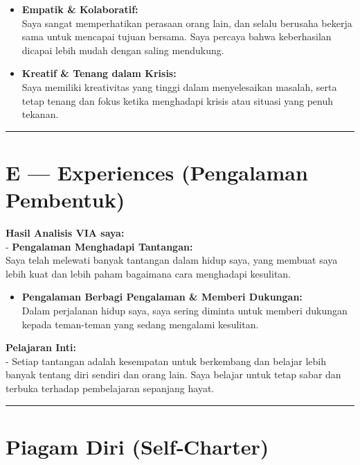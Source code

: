 \documentclass[
  letterpaper,
  DIV=11,
  numbers=noendperiod]{scrreprt}
\providecommand{\tightlist}{%
  \setlength{\itemsep}{0pt}\setlength{\parskip}{0pt}}
\begin{document}
\begin{itemize}
\item
  \textbf{Empatik \& Kolaboratif:}\\
  Saya sangat memperhatikan perasaan orang lain, dan selalu berusaha
  bekerja sama untuk mencapai tujuan bersama. Saya percaya bahwa
  keberhasilan dicapai lebih mudah dengan saling mendukung.
\item
  \textbf{Kreatif \& Tenang dalam Krisis:}\\
  Saya memiliki kreativitas yang tinggi dalam menyelesaikan masalah,
  serta tetap tenang dan fokus ketika menghadapi krisis atau situasi
  yang penuh tekanan.
\end{itemize}

\begin{center}\rule{0.5\linewidth}{0.5pt}\end{center}

\section{E --- Experiences (Pengalaman
Pembentuk)}\label{e-experiences-pengalaman-pembentuk}

\textbf{Hasil Analisis VIA saya:}\\
- \textbf{Pengalaman Menghadapi Tantangan:}\\
Saya telah melewati banyak tantangan dalam hidup saya, yang membuat saya
lebih kuat dan lebih paham bagaimana cara menghadapi kesulitan.

\begin{itemize}
\tightlist
\item
  \textbf{Pengalaman Berbagi Pengalaman \& Memberi Dukungan:}\\
  Dalam perjalanan hidup saya, saya sering diminta untuk memberi
  dukungan kepada teman-teman yang sedang mengalami kesulitan.
\end{itemize}

\textbf{Pelajaran Inti:}\\
- Setiap tantangan adalah kesempatan untuk berkembang dan belajar lebih
banyak tentang diri sendiri dan orang lain. Saya belajar untuk tetap
sabar dan terbuka terhadap pembelajaran sepanjang hayat.

\begin{center}\rule{0.5\linewidth}{0.5pt}\end{center}

\section{Piagam Diri (Self‑Charter)}\label{piagam-diri-selfcharter}
\end{document}
